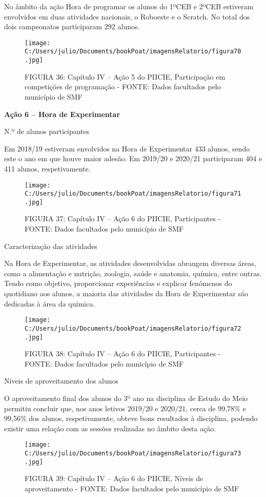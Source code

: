 \documentclass[
]{book}
\begin{document}
No âmbito da ação Hora de programar os alunos do 1ºCEB e 2ºCEB estiveram envolvidos em duas atividades nacionais, o Roboeste e o Scratch. No total dos dois campeonatos participaram 292 alunos.

\begin{figure}
\centering
\texttt{[image: C:/Users/julio/Documents/bookPoat/imagensRelatorio/figura70.jpg]}
\caption{FIGURA 36: Capítulo IV -- Ação 5 do PIICIE, Participação em competições de programação - FONTE: Dados facultados pelo município de SMF}
\end{figure}

\textbf{Ação 6 -- Hora de Experimentar}

N.º de alunos participantes

Em 2018/19 estiveram envolvidos na Hora de Experimentar 433 alunos, sendo este o ano em que houve maior adesão. Em 2019/20 e 2020/21 participaram 404 e 411 alunos, respetivamente.

\begin{figure}
\centering
\texttt{[image: C:/Users/julio/Documents/bookPoat/imagensRelatorio/figura71.jpg]}
\caption{FIGURA 37: Capítulo IV -- Ação 6 do PIICIE, Participantes - FONTE: Dados facultados pelo município de SMF}
\end{figure}

Caracterização das atividades

Na Hora de Experimentar, as atividades desenvolvidas abrangem diversas áreas, como a alimentação e nutrição, zoologia, saúde e anatomia, química, entre outras. Tendo como objetivo, proporcionar experiências e explicar fenómenos do quotidiano aos alunos, a maioria das atividades da Hora de Experimentar são dedicadas à área da química.

\begin{figure}
\centering
\texttt{[image: C:/Users/julio/Documents/bookPoat/imagensRelatorio/figura72.jpg]}
\caption{FIGURA 38: Capítulo IV -- Ação 6 do PIICIE, Participantes - FONTE: Dados facultados pelo município de SMF}
\end{figure}

Níveis de aproveitamento dos alunos

O aproveitamento final dos alunos do 3º ano na disciplina de Estudo do Meio permitiu concluir que, nos anos letivos 2019/20 e 2020/21, cerca de 99,78\% e 99,56\% dos alunos, respetivamente, obteve bons resultados à disciplina, podendo existir uma relação com as sessões realizadas no âmbito desta ação.

\begin{figure}
\centering
\texttt{[image: C:/Users/julio/Documents/bookPoat/imagensRelatorio/figura73.jpg]}
\caption{FIGURA 39: Capítulo IV -- Ação 6 do PIICIE, Níveis de aproveitamento - FONTE: Dados facultados pelo município de SMF}
\end{figure}
\end{document}
